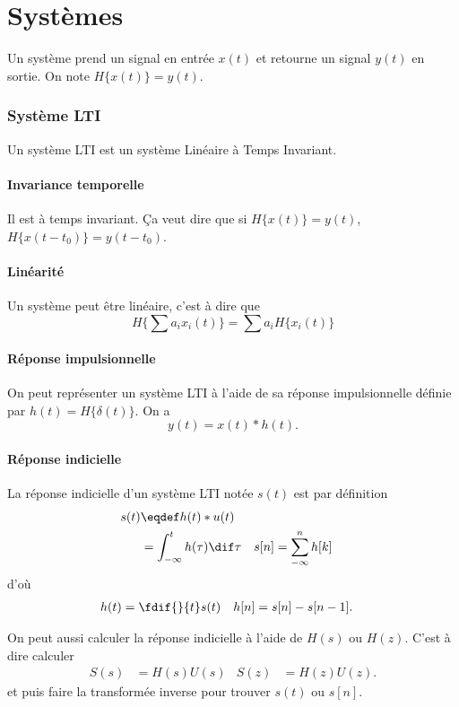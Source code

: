 \part{Systèmes}
Un système prend un signal en entrée $x(t)$ et retourne un signal $y(t)$
en sortie.
On note $H\{x(t)\} = y(t)$.

\section{Système LTI}
Un système LTI est un système Linéaire à Temps Invariant.

\subsection{Invariance temporelle}
Il est à temps invariant.
Ça veut dire que si $H\{x(t)\} = y(t)$, $H\{x(t-t_0)\} = y(t-t_0)$.

\subsection{Linéarité}
Un système peut être linéaire, c'est à dire que
\[ H\{\sum a_ix_i(t)\} = \sum a_iH\{x_i(t)\} \]

\subsection{Réponse impulsionnelle}
On peut représenter un système LTI à l'aide de sa réponse impulsionnelle
définie par $h(t) = H\{\delta(t)\}$. On a
\[ y(t) = x(t) * h(t). \]

\subsection{Réponse indicielle}
La réponse indicielle d'un système LTI notée $s(t)$ est par définition
\begin{align*}
  s(t) & \eqdef h(t) * u(t)\\
  & = \int_{-\infty}^t h(\tau) \dif \tau &
  s[n] & = \sum_{-\infty}^n h[k]
\end{align*}
d'où
\begin{align*}
  h(t) & = \fdif{}{t}s(t) & h[n] & = s[n] - s[n-1].
\end{align*}

On peut aussi calculer la réponse indicielle à l'aide de $H(s)$
ou $H(z)$.
C'est à dire calculer
\begin{align*}
  S(s) & = H(s)U(s) & S(z) & = H(z)U(z).
\end{align*}
et puis faire la transformée inverse pour trouver $s(t)$ ou $s[n]$.

